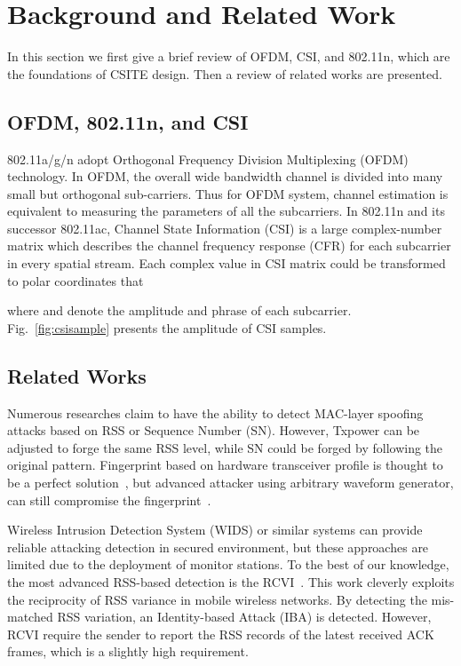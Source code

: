 \documentclass[conference]{IEEEtran}
\begin{document}
\section{Background and Related Work}
\label{sec:related}

In this section we first give a brief review of OFDM, CSI, and 802.11n, which are the foundations of
CSITE design. Then a review of related works are presented.


\subsection{OFDM, 802.11n, and CSI}



802.11a/g/n adopt Orthogonal Frequency Division Multiplexing (OFDM)
technology. In OFDM, the overall wide bandwidth channel is divided
into many small but orthogonal sub-carriers. Thus for OFDM system,
channel estimation is equivalent to measuring the parameters
of all the subcarriers. In 802.11n and its successor 802.11ac, Channel
State Information (CSI) is a large complex-number matrix which describes
the channel frequency response (CFR) for each subcarrier in every spatial stream.
Each complex value  in CSI matrix
could be transformed to polar coordinates that


where  and  denote the amplitude and phrase of each subcarrier. Fig.~\ref{fig:csisample} presents the amplitude of CSI samples.





\subsection{Related Works}

Numerous researches claim to have the ability to detect MAC-layer spoofing attacks based on RSS or Sequence Number (SN).
 However, Txpower can be adjusted to forge the same RSS level,
 while SN could be forged by following the original pattern. Fingerprint
based on hardware transceiver profile is thought to be a perfect
solution~\cite{barbeau2006detecting}, but advanced attacker using
arbitrary waveform generator, can still compromise the
fingerprint~\cite{danev2010attacks}.

Wireless Intrusion Detection System (WIDS) or similar systems \cite{chen2007detecting,sheng2008detecting,
yang2009determining} can provide reliable attacking detection in secured environment, but these approaches are limited due to the deployment of monitor stations.
To the best of our knowledge, the most advanced RSS-based detection is the RCVI~\cite{zeng2011identity}. This work cleverly exploits the reciprocity of RSS variance in mobile wireless networks. By detecting the mis-matched RSS variation, an Identity-based Attack (IBA) is detected. However, RCVI require the sender to report the RSS records of the latest received ACK frames, which is a slightly high requirement.
\end{document}
